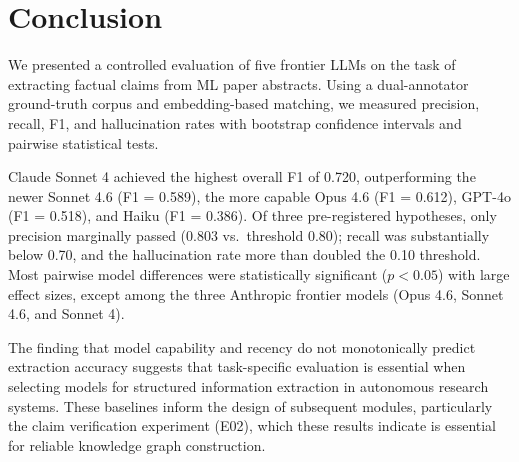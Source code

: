 \documentclass[11pt,a4paper]{article}
\begin{document}
\section{Conclusion}
\label{sec:conclusion}

We presented a controlled evaluation of five frontier LLMs on the task of
extracting factual claims from ML paper abstracts.  Using a dual-annotator
ground-truth corpus and embedding-based matching, we measured precision,
recall, F1, and hallucination rates with bootstrap confidence intervals
and pairwise statistical tests.

Claude Sonnet 4 achieved the highest overall F1 of 0.720, outperforming
the newer Sonnet 4.6 (F1 = 0.589), the more capable Opus 4.6
(F1 = 0.612), GPT-4o (F1 = 0.518), and Haiku (F1 = 0.386).  Of three
pre-registered hypotheses, only precision marginally passed (0.803 vs.\
threshold 0.80); recall was substantially below 0.70, and the
hallucination rate more than doubled the 0.10 threshold.  Most pairwise
model differences were statistically significant ($p < 0.05$) with large
effect sizes, except among the three Anthropic frontier models (Opus 4.6,
Sonnet 4.6, and Sonnet 4).

The finding that model capability and recency do not monotonically predict
extraction accuracy suggests that task-specific evaluation is essential
when selecting models for structured information extraction in autonomous
research systems.  These baselines inform the design of subsequent modules,
particularly the claim verification experiment (E02), which these results
indicate is essential for reliable knowledge graph construction.


\end{document}
